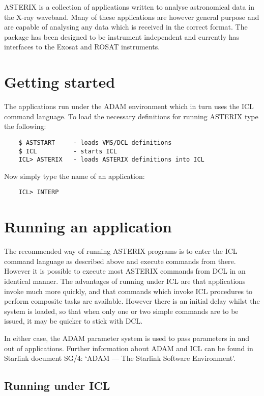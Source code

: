 ASTERIX is a collection of applications written to analyse astronomical data in
the X-ray waveband. Many of these applications are however general  purpose and
are capable of analysing any data which is received in the correct format. The
package has been designed to be instrument independent and currently has
interfaces to the Exosat and ROSAT instruments. 

\section{Getting started }

The applications run under the ADAM environment which in turn uses the ICL
command language. To load the necessary definitions for running ASTERIX
type the following:
\begin{verbatim}
    $ ASTSTART     - loads VMS/DCL definitions 
    $ ICL          - starts ICL
    ICL> ASTERIX   - loads ASTERIX definitions into ICL
\end{verbatim}             
Now simply type the name of an application:       
\begin{verbatim}
    ICL> INTERP
\end{verbatim}

\section{Running an application }

The recommended way of running ASTERIX programs is to enter the ICL command
language as described above and execute commands from there. However it is
possible to execute most ASTERIX commands from DCL in an identical manner.  The
advantages of running under ICL are that applications invoke much more quickly,
and that commands which invoke ICL procedures to perform composite tasks are
available. However there is an initial delay whilst the system is loaded, so
that when only one or two simple commands are to be issued, it may be quicker
to stick with DCL.

In either case, the ADAM parameter system is used to pass parameters in and out
of applications. Further information about ADAM and ICL can be found in
Starlink document SG/4: `ADAM --- The Starlink Software Environment'.

\subsection{Running under ICL }

